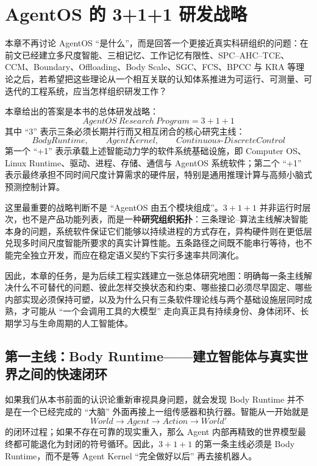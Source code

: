 \chapter{AgentOS 的 3+1+1 研发战略}
\label{chap:agentos-3plus1plus1-roadmap}

\begin{chapterlead}
本章不再讨论 AgentOS ``是什么''，而是回答一个更接近真实科研组织的问题：在前文已经建立多尺度智能、三相记忆、工作记忆有限性、SPC--AHC--TCE、CCM、Boundary、Offloading、Body Scale、SGC、FCS、BPCC 与 KRA 等理论之后，若希望把这些理论从一个相互关联的认知体系推进为可运行、可测量、可迭代的工程系统，应当怎样组织研发工作？

本章给出的答案是本书的总体研发战略：
\[
\boxed{
AgentOS\ Research\ Program = 3 + 1 + 1
}
\]
其中 ``3'' 表示三条必须长期并行而又相互闭合的核心研究主线：
\[
\boxed{
BodyRuntime,\qquad AgentKernel,\qquad Continuous\text{-}DiscreteControl
}
\]
第一个 ``+1'' 表示承载上述智能动力学的软件系统基础设施，即 Computer OS、Linux Runtime、驱动、进程、存储、通信与 AgentOS 系统软件；第二个 ``+1'' 表示最终承担不同时间尺度计算需求的硬件层，特别是通用推理计算与高频小脑式预测控制计算。

这里最重要的战略判断不是 ``AgentOS 由五个模块组成''。$3+1+1$ 并非运行时层次，也不是产品功能列表，而是一种\textbf{研究组织拓扑}：三条理论--算法主线解决智能本身的问题，系统软件保证它们能够以持续进程的方式存在，异构硬件则在更低层兑现多时间尺度智能所要求的真实计算性能。五条路径之间既不能串行等待，也不能完全独立开发，而应在稳定语义契约下实行多速率共同演化。

因此，本章的任务，是为后续工程实践建立一张总体研究地图：明确每一条主线解决什么不可替代的问题、彼此怎样交换状态和约束、哪些接口必须尽早固定、哪些内部实现必须保持可塑，以及为什么只有三条软件理论线与两个基础设施层同时成熟，才可能从 ``一个会调用工具的大模型'' 走向真正具有持续身份、身体闭环、长期学习与生命周期的人工智能体。
\end{chapterlead}

\section{第一主线：Body Runtime——建立智能体与真实世界之间的快速闭环}
\label{sec:roadmap-body-runtime}

如果我们从本书前面的认识论重新审视具身问题，就会发现 Body Runtime 并不是在一个已经完成的 ``大脑'' 外面再接上一组传感器和执行器。智能从一开始就是
\[
World \rightarrow Agent \rightarrow Action \rightarrow World'
\]
的闭环过程；如果不存在可靠的现实重入，那么 Agent 内部再精致的世界模型最终都可能退化为封闭的符号循环。因此，$3+1+1$ 的第一条主线必须是 Body Runtime，而不是等 Agent Kernel ``完全做好以后'' 再去接机器人。

